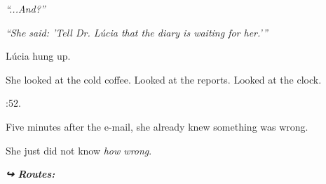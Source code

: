 \noindent \textit{\textquotedblleft{}...And?\textquotedblright{}}

\noindent \textit{\textquotedblleft{}She said: 'Tell Dr. Lúcia that the diary is waiting for her.'\textquotedblright{}}

\noindent Lúcia hung up.

\noindent She looked at the cold coffee.
Looked at the reports.
Looked at the clock.

:52.

\noindent Five minutes after the e-mail, she already knew something was wrong.

\noindent She just did not know \textit{how wrong}.

\vspace{0.5em}
\noindent\textit{\textbf{↪ Routes:}  \rotasep {}}
